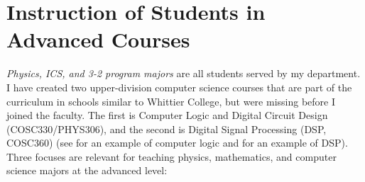 \documentclass[../../../main.tex]{subfiles}
\begin{document}
\section{Instruction of Students in Advanced Courses}

\textit{Physics, ICS, and 3-2 program majors} are all students served by my department.  I have created two upper-division computer science courses that are part of the curriculum in schools similar to Whittier College, but were missing before I joined the faculty.  The first is Computer Logic and Digital Circuit Design (COSC330/PHYS306), and the second is Digital Signal Processing (DSP, COSC360) (see \cite{hmc} for an example of computer logic and \cite{rio_hondo} for an example of DSP).
\\
\vspace{0.15cm}
Three focuses are relevant for teaching physics, mathematics, and computer science majors at the advanced level:
\end{document}
